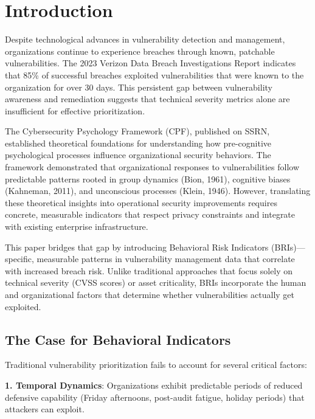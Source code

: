 \documentclass[11pt,a4paper]{article}
\begin{document}
\vspace{1cm}

\section{Introduction}

Despite technological advances in vulnerability detection and management, organizations continue to experience breaches through known, patchable vulnerabilities. The 2023 Verizon Data Breach Investigations Report indicates that 85\% of successful breaches exploited vulnerabilities that were known to the organization for over 30 days\cite{verizon2023}. This persistent gap between vulnerability awareness and remediation suggests that technical severity metrics alone are insufficient for effective prioritization.

The Cybersecurity Psychology Framework (CPF)\cite{canale2024cpf}, published on SSRN, established theoretical foundations for understanding how pre-cognitive psychological processes influence organizational security behaviors. The framework demonstrated that organizational responses to vulnerabilities follow predictable patterns rooted in group dynamics (Bion, 1961), cognitive biases (Kahneman, 2011), and unconscious processes (Klein, 1946). However, translating these theoretical insights into operational security improvements requires concrete, measurable indicators that respect privacy constraints and integrate with existing enterprise infrastructure.

This paper bridges that gap by introducing Behavioral Risk Indicators (BRIs)—specific, measurable patterns in vulnerability management data that correlate with increased breach risk. Unlike traditional approaches that focus solely on technical severity (CVSS scores) or asset criticality, BRIs incorporate the human and organizational factors that determine whether vulnerabilities actually get exploited.

\subsection{The Case for Behavioral Indicators}

Traditional vulnerability prioritization fails to account for several critical factors:

\textbf{1. Temporal Dynamics}: Organizations exhibit predictable periods of reduced defensive capability (Friday afternoons, post-audit fatigue, holiday periods) that attackers can exploit.
\end{document}
